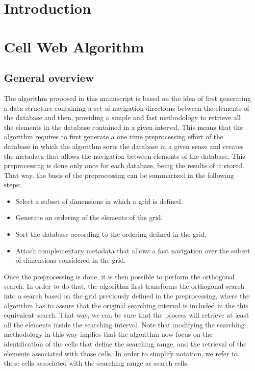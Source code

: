 \documentclass[preprint,12pt]{elsarticle}
\begin{document}

\section{Introduction}
\label{sec:intro}


\section{Cell Web Algorithm}
\label{sec:algorithm}

\subsection{General overview}
\label{sec:idea}

The algorithm proposed in this manuscript is based on the idea of first generating a data structure containing a set of navigation directions between the elements of the database and then, providing a simple and fast methodology to retrieve all the elements in the database contained in a given interval. This means that the algorithm requires to first generate a one time preprocessing effort of the database in which the algorithm sorts the database in a given sense and creates the metadata that allows the navigation between elements of the database. This preprocessing is done only once for each database, being the results of it stored. That way, the basis of the preprocessing can be summarized in the following steps:
\begin{itemize}
  \item Select a subset of dimensions in which a grid is defined.
  \item Generate an ordering of the elements of the grid.
  \item Sort the database according to the ordering defined in the grid.
  \item Attach complementary metadata that allows a fast navigation over the subset of dimensions considered in the grid.
\end{itemize}

Once the preprocessing is done, it is then possible to perform the orthogonal search. In order to do that, the algorithm first transforms the orthogonal search into a search based on the grid previously defined in the preprocessing, where the algorithm has to assure that the original searching interval is included in the this equivalent search. That way, we can be sure that the process will retrieve at least all the elements inside the searching interval. Note that modifying the searching methodology in this way implies that the algorithm now focus on the identification of the cells that define the searching range, and the retrieval of the elements associated with those cells. In order to simplify notation, we refer to these cells associated with the searching range as search cells.
\end{document}

